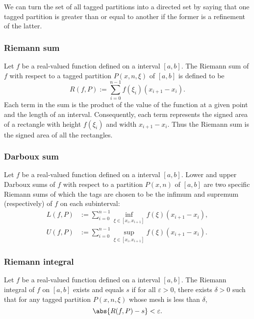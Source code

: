 \documentclass[a4paper,12pt]{report}
\begin{document}
\begin{itemize}
\begin{itemize}
We can turn the set of all tagged partitions into a directed set by saying that one tagged partition is greater than or equal to another if the former is a refinement of the latter.
\subsubsection{Riemann sum}
Let $f$ be a real-valued function defined on a interval $[a,b]$. The Riemann sum of $f$ with respect to a tagged partition $P(x,n,\xi)$ of $[a,b]$ is defined to be
\[R(f,P):=\sum_{i=0}^{n-1}f(\xi_i)\left(x_{i+1}-x_i\right).\]
Each term in the sum is the product of the value of the function at a given point and the length of an interval. Consequently, each term represents the signed area of a rectangle with height $f(\xi_i)$ and width $x_{i + 1} − x_i$. Thus the Riemann sum is the signed area of all the rectangles.
\subsubsection{Darboux sum}
Let $f$ be a real-valued function defined on a interval $[a,b]$. Lower and upper Darboux sums of $f$ with respect to a partition $P(x,n)$ of $[a,b]$ are two specific Riemann sums of which the tags are chosen to be the infimum and supremum (respectively) of $f$ on each subinterval:
\[\begin{aligned}
L(f,P)&:=\sum_{i=0}^{n-1}\inf_{\xi\in [x_i,x_{i+1}]}f(\xi)(x_{i+1}-x_i),\\
U(f,P)&:=\sum_{i=0}^{n-1}\sup_{\xi\in [x_i,x_{i+1}]}f(\xi)(x_{i+1}-x_i).
\end{aligned}\] 
\subsubsection{Riemann integral}
Let $f$ be a real-valued function defined on a interval $[a,b]$. The Riemann integral of $f$ on $[a,b]$ exists and equals $s$ if for all $\varepsilon > 0$, there exists $\delta > 0$ such that for any tagged partition $P(x,n,\xi)$ whose mesh is less than $\delta$,
\[\abs{R(f,P)-s}<\varepsilon .\]

\end{itemize}
\end{itemize}
\end{document}

